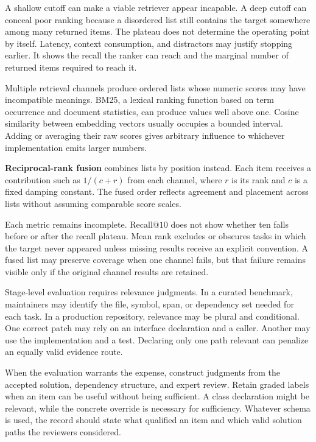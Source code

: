 A shallow cutoff can make a viable retriever appear incapable. A deep cutoff can conceal poor ranking because a disordered list still contains the target somewhere among many returned items. The plateau does not determine the operating point by itself. Latency, context consumption, and distractors may justify stopping earlier. It shows the recall the ranker can reach and the marginal number of returned items required to reach it.

Multiple retrieval channels produce ordered lists whose numeric scores may have incompatible meanings. BM25, a lexical ranking function based on term occurrence and document statistics, can produce values well above one. Cosine similarity between embedding vectors usually occupies a bounded interval. Adding or averaging their raw scores gives arbitrary influence to whichever implementation emits larger numbers.

\textbf{Reciprocal-rank fusion} combines lists by position instead. Each item receives a contribution such as \(1/(c+r)\) from each channel, where \(r\) is its rank and \(c\) is a fixed damping constant. The fused order reflects agreement and placement across lists without assuming comparable score scales.

Each metric remains incomplete. \(\mathrm{Recall}@10\) does not show whether ten falls before or after the recall plateau. Mean rank excludes or obscures tasks in which the target never appeared unless missing results receive an explicit convention. A fused list may preserve coverage when one channel fails, but that failure remains visible only if the original channel results are retained.

Stage-level evaluation requires relevance judgments. In a curated benchmark, maintainers may identify the file, symbol, span, or dependency set needed for each task. In a production repository, relevance may be plural and conditional. One correct patch may rely on an interface declaration and a caller. Another may use the implementation and a test. Declaring only one path relevant can penalize an equally valid evidence route.

When the evaluation warrants the expense, construct judgments from the accepted solution, dependency structure, and expert review. Retain graded labels when an item can be useful without being sufficient. A class declaration might be relevant, while the concrete override is necessary for sufficiency. Whatever schema is used, the record should state what qualified an item and which valid solution paths the reviewers considered.

